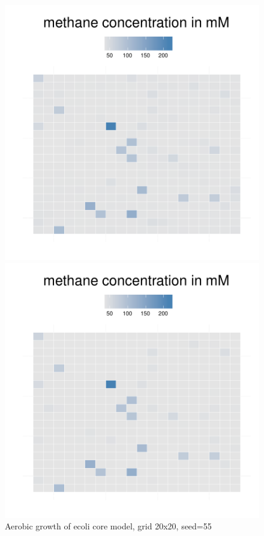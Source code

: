 \begin{figure}[h]
{\begin{minipage}[t]{0.3\textwidth}
  \end{minipage}
  \begin{minipage}[t]{0.3\textwidth}
    \includegraphics[width=\textwidth]{../results/barkeri_20x20_seed9659_meth100.pdf}
  \end{minipage}
  \begin{minipage}[t]{0.3\textwidth}
    \includegraphics[width=\textwidth]{../results/barkeri_20x20_seed9659_meth130.pdf}
  \end{minipage}
  }
  \caption{Aerobic growth of ecoli core model, grid 20x20, seed=55}
\end{figure}


